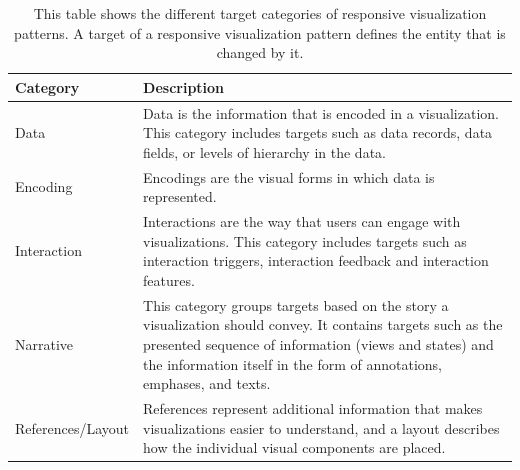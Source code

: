 \begin{table}[tp]
    \centering
    \begin{tabularx}{\linewidth}{| l | X |}
        \hline
        \textbf{Category} & \textbf{Description} \\ \hline
        Data & Data is the information that is encoded in a visualization. This category includes targets such as data records, data fields, or levels of hierarchy in the data.  \\ 
        \hline
        Encoding & Encodings are the visual forms in which data is represented.  \\ 
        \hline
        Interaction & Interactions are the way that users can engage with visualizations. This category includes targets such as interaction triggers, interaction feedback and interaction features. \\ 
        \hline
        Narrative & This category groups targets based on the story a visualization should convey. It contains targets such as the presented sequence of information (views and states) and the information itself in the form of annotations, emphases, and texts. \\ 
        \hline
        References/Layout & References represent additional information that makes visualizations easier to understand, and a layout describes how the individual visual components are placed. \\ 
        \hline
    \end{tabularx}
    \caption[Targets of Responsive Visualization Patterns]
    {
        This table shows the different target categories of responsive visualization patterns. A target of a responsive visualization pattern defines the entity that is changed by it.
    }
    \label{tab:PatternsTargets}
\end{table}

